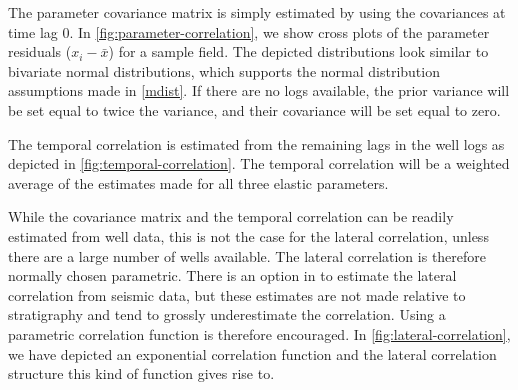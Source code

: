 The parameter covariance matrix is simply estimated by using the
covariances at time lag 0. In \autoref{fig:parameter-correlation}, we
show cross plots of the parameter residuals ($x_i - \bar{x}$) for a
sample field. The depicted distributions look similar to bivariate
normal distributions, which supports the normal distribution
assumptions made in \autoref{mdist}. If there are no \vs logs
available, the prior \vs variance will be set equal to twice the \vp
variance, and their covariance will be set equal to zero.

The temporal correlation is estimated from the remaining lags in the
well logs as depicted in \autoref{fig:temporal-correlation}. The
temporal correlation will be a weighted average of the estimates made
for all three elastic parameters.

While the covariance matrix and the temporal correlation can be readily
estimated from well data, this is not the case for the lateral
correlation, unless there are a large number of wells available. The
lateral correlation is therefore normally chosen parametric. There is
an option in \crava to estimate the lateral correlation from seismic
data, but these estimates are not made relative to stratigraphy and
tend to grossly underestimate the correlation. Using a parametric
correlation function is therefore encouraged. In
\autoref{fig:lateral-correlation}, we have depicted an exponential
correlation function and the lateral correlation structure this kind
of function gives rise to.


